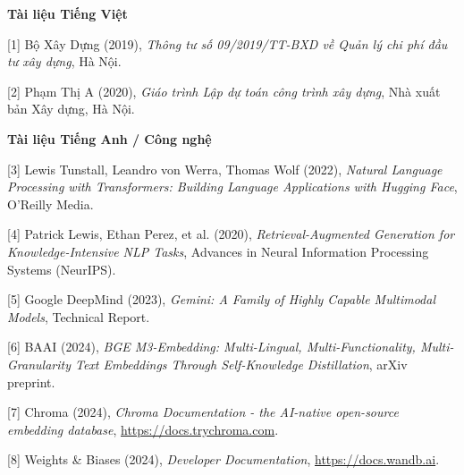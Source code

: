

\vspace{10pt}
\textbf{Tài liệu Tiếng Việt}

[1] Bộ Xây Dựng (2019), \textit{Thông tư số 09/2019/TT-BXD về Quản lý chi phí đầu tư xây dựng}, Hà Nội.

[2] Phạm Thị A (2020), \textit{Giáo trình Lập dự toán công trình xây dựng}, Nhà xuất bản Xây dựng, Hà Nội.

\vspace{10pt}
\textbf{Tài liệu Tiếng Anh / Công nghệ}

[3] Lewis Tunstall, Leandro von Werra, Thomas Wolf (2022), \textit{Natural Language Processing with Transformers: Building Language Applications with Hugging Face}, O'Reilly Media.

[4] Patrick Lewis, Ethan Perez, et al. (2020), \textit{Retrieval-Augmented Generation for Knowledge-Intensive NLP Tasks}, Advances in Neural Information Processing Systems (NeurIPS).

[5] Google DeepMind (2023), \textit{Gemini: A Family of Highly Capable Multimodal Models}, Technical Report.

[6] BAAI (2024), \textit{BGE M3-Embedding: Multi-Lingual, Multi-Functionality, Multi-Granularity Text Embeddings Through Self-Knowledge Distillation}, arXiv preprint.

[7] Chroma (2024), \textit{Chroma Documentation - the AI-native open-source embedding database}, \url{https://docs.trychroma.com}.

[8] Weights \& Biases (2024), \textit{Developer Documentation}, \url{https://docs.wandb.ai}.
